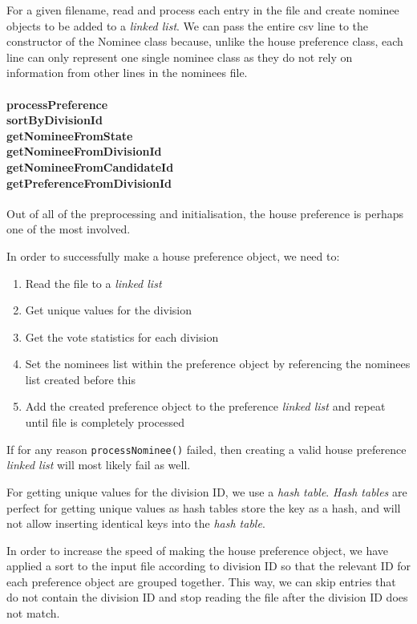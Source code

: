 \documentclass[a4paper, 12pt, titlepage]{article}
\newcommand{\code}[1]{\small\texttt{#1}\normalsize}
\begin{document}
For a given filename, read and process each entry in the file and create
nominee objects to be added to a \textit{linked list}. We can pass the
entire csv line to the constructor of the Nominee class because, unlike
the house preference class, each line can only represent one single nominee
class as they do not rely on information from other lines in the nominees
file.

\paragraph{processPreference \\
           sortByDivisionId \\
           getNomineeFromState \\
           getNomineeFromDivisionId \\
           getNomineeFromCandidateId \\
           getPreferenceFromDivisionId
} \hspace{0pt}

Out of all of the preprocessing and initialisation, the house preference
is perhaps one of the most involved.

In order to successfully make a house preference object, we need to:
\begin{enumerate}
    \item Read the file to a \textit{linked list}
    \item Get unique values for the division
    \item Get the vote statistics for each division
    \item Set the nominees list within the preference object by referencing
          the nominees list created before this
    \item Add the created preference object to the preference
          \textit{linked list} and repeat until file is completely processed
\end{enumerate}

If for any reason \code{processNominee()} failed, then creating a valid
house preference \textit{linked list} will most likely fail as well.

For getting unique values for the division ID, we use a \textit{hash table}.
\textit{Hash tables} are perfect for getting unique values as hash tables
store the key as a hash, and will not allow inserting identical keys into
the \textit{hash table}.

In order to increase the speed of making the house preference object, we
have applied a sort to the input file according to division ID so that the
relevant ID for each preference object are grouped together. This way, we can
skip entries that do not contain the division ID and stop reading the file
after the division ID does not match.
\end{document}
